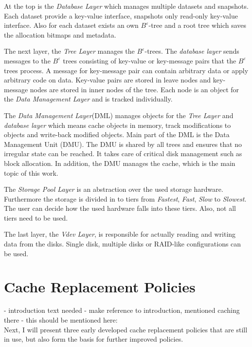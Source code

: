 \documentclass[
	12pt,
	a4paper,
	abstract,
	bibliography=totoc,
	chapterprefix,
	headings=openright,
	numbers=endperiod,
	parskip=half,
	twoside,
]{scrreprt}
\begin{document}
At the top is the \emph{Database Layer} which manages multiple datasets and snapshots. Each dataset provide a key-value interface, snapshots only read-only key-value interface. Also for each dataset exists an own $B^{\varepsilon}$-tree and  a root tree which saves the allocation bitmaps and metadata.

The next layer, the \emph{Tree Layer} manages the $B^{\varepsilon}$-trees.
The \emph{database layer} sends messages to the $B^{\varepsilon}$ trees consisting of key-value or key-message pairs that the $B^{\varepsilon}$ trees process. A message for key-message pair can contain arbitrary data or apply arbitrary code on data.
Key-value pairs are stored in leave nodes and key-message nodes are stored in inner nodes of the tree.
Each node is an object for the \emph{Data Management Layer} and is tracked individually.

The \emph{Data Management Layer}(DML) manages objects for the \emph{Tree Layer} and \emph{database layer} which means cache objects in memory, 
track modifications to objects and write-back modified objects.
Main part of the DML is the Data Management Unit (DMU).
The DMU is shared by all trees and ensures that no irregular state can be reached.
It takes care of critical disk management such as block allocation.
In addition, the DMU manages the cache, which is the main topic of this work.

The \emph{Storage Pool Layer} is an abstraction over the used storage hardware.
Furthermore the storage is divided in to tiers from \emph{Fastest}, \emph{Fast}, \emph{Slow} to \emph{Slowest}.
The user can decide how the used hardware falls into these tiers. Also, not all tiers need to be used.

The last layer, the \emph{Vdev Layer}, is responsible for actually reading and writing data from the disks.
Single disk, multiple disks or RAID-like configurations can be used.

\section{Cache Replacement Policies}
\label{sec:cache replacement policies}

- introduction text needed
- make reference to introduction, mentioned caching there
- this should be mentioned here:\\
Next, I will present three early developed cache replacement policies that are still in use, but also form the basis for further improved policies.
\end{document}
